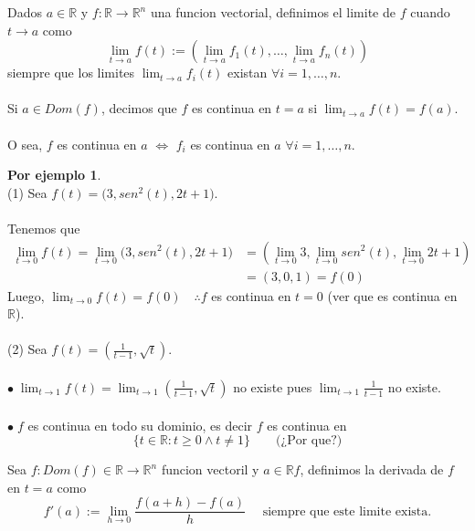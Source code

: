\documentclass{article}
\theoremstyle{definition}
\theoremstyle{definition}
\newtheorem*{ej}{Por ejemplo}
\theoremstyle{remark}
\newcommand\bl{$\bullet\;$}
\begin{document}
  \; 
  \pagebreak \begin{defi}
  Dados $a \in \mathbb{R}$ y $f : \mathbb{R} \to \mathbb{R}^n$ una funcion vectorial, definimos el limite de $f$ cuando $t \to a $ como \[ 
  \lim_{t \to a}{f(t)} := \left( \lim_{t \to a}{f_1(t)}, \dots , \lim_{t \to a }{f_n(t)} \right) \]
  siempre que los limites $\lim_{t \to a}{f_i(t)}$ existan $\forall i = 1, \dots ,n$. 
  \\\\
Si $a \in Dom(f)$, decimos que $f$ es continua en $t=a$ si $\lim_{t \to a}{f(t) = f(a)}$.
\\ \\
O sea, $f$ es continua en $a$ $\Leftrightarrow$ $f_i$ es continua en $a$ $\forall i = 1, \dots , n$.
  \end{defi}
\begin{ej} \; \\
  \textcolor{verdep2}{(1)} Sea $f(t)=\big(3,sen^2(t),2t+1\big).$ \\ \\ Tenemos que \[ 
    \begin{aligned}
      \lim_{t\to 0}{f(t)}=\lim_{t \to 0}{\big(3,sen^2(t),2t+1\big)} &=\left(\lim_{t \to 0}{3},\lim_{t \to 0}{sen^2(t)},\lim_{t \to 0}{2t+1}\right) \\ 
                          &= (3,0,1)=f(0)
    \end{aligned}
  \]Luego, $\lim_{t \to 0}{f(t)=f(0)} \quad \therefore f$ es continua en $t=0$ (ver que es continua en $\mathbb{R}$).\\\\
  \textcolor{verdep2}{(2)} Sea $f(t)=\left(\frac{1}{t-1},\sqrt{t}\right)$. \\ \\ \bl $\lim_{t \to 1}{f(t)}=\lim_{t \to 1}{\left(\frac{1}{t-1},\sqrt{t}\right)}$ no existe pues $\lim_{t \to 1}{\frac{1}{t-1}}$ no existe. \\ \\ 
  \bl $f$ es continua en todo su dominio, es decir $f$ es continua en \[ 
    \{t \in \mathbb{R} : t \geq 0 \land t \neq 1 \} \quad \quad \big(\text{¿Por que?}\big)
  \]
\end{ej}
\begin{defi}
  Sea $f : Dom(f) \in \mathbb{R} \to \mathbb{R}^n$ funcion vectoril y $a \in \mathbb{R}f$, definimos la derivada de $f$ en $t=a$ como \[
    f'(a):= \lim_{h \to 0}{\frac{f(a+h)-f(a)}{h}} \quad \text{ siempre que este limite exista.}
  \]
\end{defi}
\end{document}
